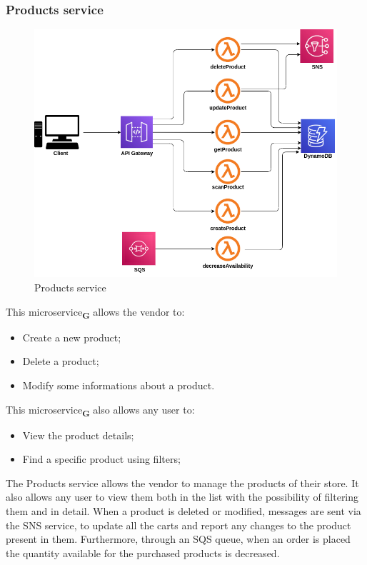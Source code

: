 \subsubsection{Products service}
\begin{figure}[!h]
    \vspace{5px}
    \includegraphics[scale=0.5]{../../../../Images/Diagrammi/maintainerManual/productService.png}
    \centering
    \caption{Products service}
\end{figure}
This microservice\textsubscript{\textbf{G}} allows the vendor to:
\begin{itemize}
    \item Create a new product;
    \item Delete a product;
    \item Modify some informations about a product.
\end{itemize}
This microservice\textsubscript{\textbf{G}} also allows any user to:
\begin{itemize}
    \item View the product details;
    \item Find a specific product using filters;
\end{itemize}
The Products service allows the vendor to manage the products of their store. It also allows any user to view them both in the list with the possibility of filtering them and in detail. When a product is deleted or modified, messages are sent via the SNS service, to update all the carts and report any changes to the product present in them. Furthermore, through an SQS queue, when an order is placed the quantity available for the purchased products is decreased.
\pagebreak
